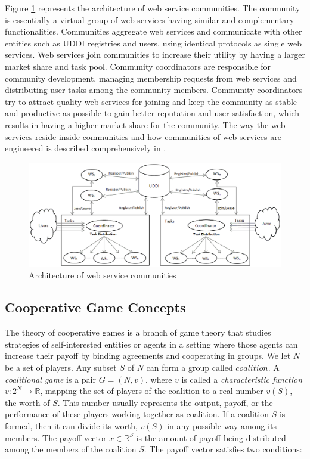 \documentclass[10pt,journal,cspaper,compsoc]{IEEEtran}
\begin{document}
Figure \ref{fig_community} represents the architecture of web
service communities. The community is essentially a virtual group
of web services having similar and complementary functionalities.
Communities aggregate web services and communicate with other
entities such as UDDI registries and users, using identical
protocols as single web services. Web services join communities to
increase their utility by having a larger market share and task
pool. Community coordinators are
responsible for community development, managing membership
requests from web services and distributing user tasks among the
community members. Community coordinators try to attract quality
web services for joining and keep the community as stable and
productive as possible to gain better reputation and user
satisfaction, which results in having a higher market share for
the community. The way the web services reside inside communities
and how communities of web services are engineered is described
comprehensively in \cite{DBLP:journals/ijebr/MaamarSTBB09}.

\begin{figure}[!t]
\centerline{\includegraphics[width=6.25in]{community.eps}}
\caption{Architecture of web service communities}
\label{fig_community}
\end{figure}

\subsection{Cooperative Game Concepts}
The theory of cooperative games is a branch of game theory that
studies strategies of self-interested entities or agents in a
setting where those agents can increase their payoff by binding
agreements and cooperating in groups. We let $N$ be a set of
players. Any subset $S$ of $N$ can form a group called
$coalition$. A \emph{coalitional game} is a pair $G = (N, v)$,
where $v$ is called a \emph{characteristic function} $v: 2^N \to
\mathbb{R}$, mapping the set of players of the coalition to a real
number $v(S)$, the worth of $S$. This number usually represents
the output, payoff, or the performance of these players working
together as coalition.  If a coalition $S$ is formed, then it can
divide its worth, $v(S)$ in any possible way among its members.
The payoff vector $x \in \mathbb{R}^S$ is the amount of payoff
being distributed among the members of the coalition $S$. The
payoff vector satisfies two conditions:
\end{document}
